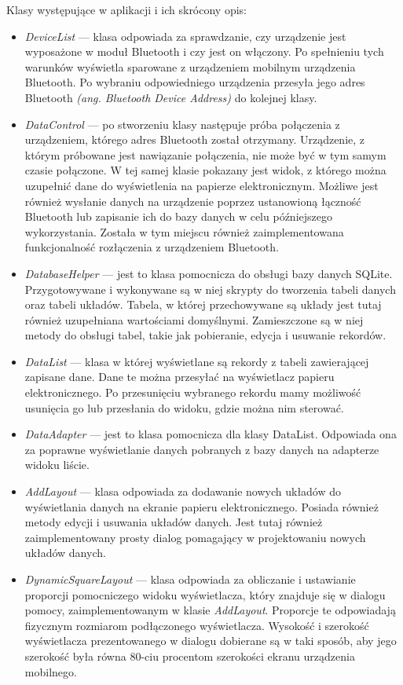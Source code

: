 \documentclass[a4paper,12pt, twoside]{article}
\begin{document}
    	Klasy występujące w aplikacji i ich skrócony opis:
    	\begin{itemize}
    	    \item \textit{DeviceList} — klasa odpowiada za sprawdzanie, czy urządzenie jest wyposażone w moduł Bluetooth i czy jest on włączony. Po spełnieniu tych warunków wyświetla sparowane z urządzeniem mobilnym urządzenia Bluetooth. Po wybraniu odpowiedniego urządzenia przesyła jego adres Bluetooth \textit{(ang. Bluetooth Device Address)}\cite{bdaddr} do kolejnej klasy.
    	    \item \textit{DataControl} — po stworzeniu klasy następuje próba połączenia z urządzeniem, którego adres Bluetooth został otrzymany. Urządzenie, z którym próbowane jest nawiązanie połączenia, nie może być w tym samym czasie połączone. W tej samej klasie pokazany jest widok, z którego można uzupełnić dane do wyświetlenia na papierze elektronicznym. Możliwe jest również wysłanie danych na urządzenie poprzez ustanowioną łączność Bluetooth lub zapisanie ich do bazy danych w celu późniejszego wykorzystania. Została w tym miejscu również zaimplementowana funkcjonalność rozłączenia z urządzeniem Bluetooth.
    	    \item \textit{DatabaseHelper} — jest to klasa pomocnicza do obsługi bazy danych SQLite. Przygotowywane i wykonywane są w niej skrypty do tworzenia tabeli danych oraz tabeli układów. Tabela, w której przechowywane są układy jest tutaj również uzupełniana wartościami domyślnymi. Zamieszczone są w niej metody do obsługi tabel, takie jak pobieranie, edycja i usuwanie rekordów.
    	    \item \textit{DataList} — klasa w której wyświetlane są rekordy z tabeli zawierającej zapisane dane. Dane te można przesyłać na wyświetlacz papieru elektronicznego. Po przesunięciu wybranego rekordu mamy możliwość usunięcia go lub przesłania do widoku, gdzie można nim sterować.
    	    \item\textit{DataAdapter} — jest to klasa pomocnicza dla klasy DataList. Odpowiada ona za poprawne wyświetlanie danych pobranych z bazy danych na adapterze widoku liście.
    	    \item \textit{AddLayout} — klasa odpowiada za dodawanie nowych układów do wyświetlania danych na ekranie papieru elektronicznego. Posiada również metody edycji i usuwania układów danych. Jest tutaj również zaimplementowany prosty dialog pomagający w projektowaniu nowych układów danych.
    	    \item \textit{DynamicSquareLayout} — klasa odpowiada za obliczanie i ustawianie proporcji pomocniczego widoku wyświetlacza, który znajduje się w dialogu pomocy, zaimplementowanym w klasie \textit{AddLayout}. Proporcje te odpowiadają fizycznym rozmiarom podłączonego wyświetlacza. Wysokość i szerokość wyświetlacza prezentowanego w dialogu dobierane są w taki sposób, aby jego szerokość była równa 80-ciu procentom szerokości ekranu urządzenia mobilnego.

\end{itemize}
\end{document}
